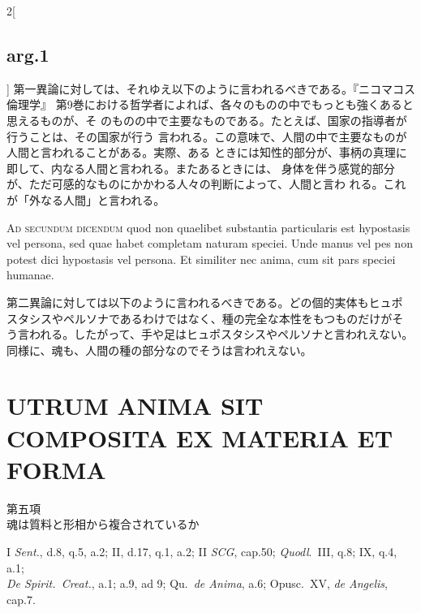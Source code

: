 \documentclass[paper=a4paper,fontsize=10pt,jafontsize=9pt,titlepage]{jlreq}
\begin{document}
\begin{paracol}{2}[\subsection{arg.1}]
第一異論に対しては、それゆえ以下のように言われるべきである。『ニコマコス倫理学』
第9巻における哲学者によれば、各々のものの中でもっとも強くあると思えるものが、そ
のものの中で主要なものである。たとえば、国家の指導者が行うことは、その国家が行う
言われる。この意味で、人間の中で主要なものが人間と言われることがある。実際、ある
ときには知性的部分が、事柄の真理に即して、内なる人間と言われる。またあるときには、
身体を伴う感覚的部分が、ただ可感的なものにかかわる人々の判断によって、人間と言わ
れる。これが「外なる人間」と言われる。

\switchcolumn*[\subsection{ad 2}]

{\scshape Ad secundum dicendum} quod non quaelibet substantia particularis est
hypostasis vel persona, sed quae habet completam naturam speciei. Unde manus vel
pes non potest dici hypostasis vel persona. Et similiter nec anima, cum sit pars
speciei humanae.

\switchcolumn

第二異論に対しては以下のように言われるべきである。どの個的実体もヒュポ
スタシスやペルソナであるわけではなく、種の完全な本性をもつものだけがそ
う言われる。したがって、手や足はヒュポスタシスやペルソナと言われえない。
同様に、魂も、人間の種の部分なのでそうは言われえない。

\end{paracol}
\newpage




\section{UTRUM ANIMA SIT COMPOSITA EX MATERIA ET FORMA}

{\Large 第五項\\魂は質料と形相から複合されているか}

{\footnotesize I {\itshape Sent.}, d.8, q.5, a.2; II, d.17, q.1, a.2; II {\itshape SCG}, cap.50; {\itshape Quodl}.~III, q.8; IX, q.4, a.1;\\ {\itshape De Spirit.~Creat.}, a.1; a.9, ad 9; Qu.~{\itshape de Anima}, a.6; Opusc.~XV, {\itshape de Angelis}, cap.7.}\\
\end{document}
